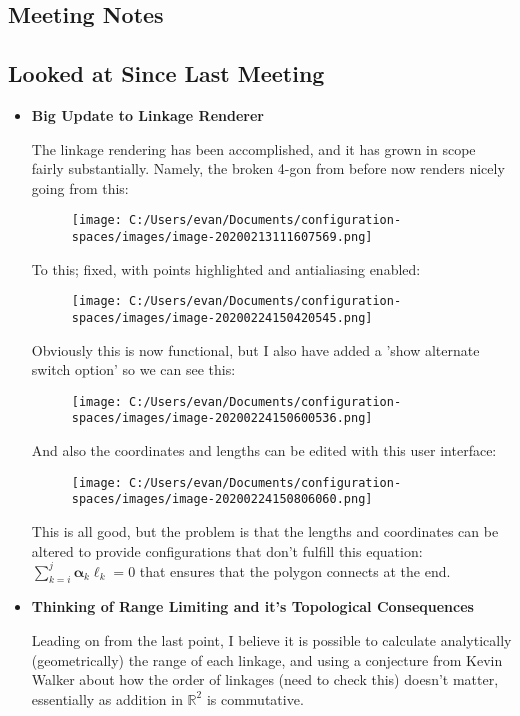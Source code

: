 \documentclass[
]{article}
\author{}
\date{}
\begin{document}
\hypertarget{header-n2}{%
\subsection{Meeting Notes}\label{header-n2}}

\hypertarget{header-n3}{%
\subsection{Looked at Since Last Meeting}\label{header-n3}}

\begin{itemize}
\item
  \textbf{Big Update to Linkage Renderer}

  The linkage rendering has been accomplished, and it has grown in scope
  fairly substantially. Namely, the broken 4-gon from before now renders
  nicely going from this:

  \begin{figure}
  \centering
  \texttt{[image: C:/Users/evan/Documents/configuration-spaces/images/image-20200213111607569.png]}
  \caption{}
  \end{figure}

  To this; fixed, with points highlighted and antialiasing enabled:

  \begin{figure}
  \centering
  \texttt{[image: C:/Users/evan/Documents/configuration-spaces/images/image-20200224150420545.png]}
  \caption{}
  \end{figure}

  Obviously this is now functional, but I also have added a 'show
  alternate switch option' so we can see this:

  \begin{figure}
  \centering
  \texttt{[image: C:/Users/evan/Documents/configuration-spaces/images/image-20200224150600536.png]}
  \caption{}
  \end{figure}

  And also the coordinates and lengths can be edited with this user
  interface:

  \begin{figure}
  \centering
  \texttt{[image: C:/Users/evan/Documents/configuration-spaces/images/image-20200224150806060.png]}
  \caption{}
  \end{figure}

  This is all good, but the problem is that the lengths and coordinates
  can be altered to provide configurations that don't fulfill this
  equation: \(\sum_{k=i}^j \boldsymbol\alpha_k \ell_k = 0 \) that
  ensures that the polygon connects at the end.
\item
  \textbf{Thinking of Range Limiting and it's Topological Consequences}

  Leading on from the last point, I believe it is possible to calculate
  analytically (geometrically) the range of each linkage, and using a
  conjecture from Kevin Walker about how the order of linkages (need to
  check this) doesn't matter, essentially as addition in \(\mathbb R^2\)
  is commutative.
\end{itemize}
\end{document}
